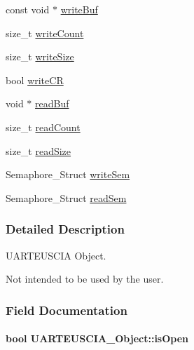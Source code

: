 \begin{DoxyCompactItemize}
const void $\ast$ \hyperlink{struct_u_a_r_t_e_u_s_c_i_a___object_a1bded79263900ea6d78a72709b5aa335}{write\+Buf}
\item 
size\+\_\+t \hyperlink{struct_u_a_r_t_e_u_s_c_i_a___object_afd15a8419bfe376197e0701d1a95848f}{write\+Count}
\item 
size\+\_\+t \hyperlink{struct_u_a_r_t_e_u_s_c_i_a___object_af5b40a1295f842f0c92a2c32d0c51a8c}{write\+Size}
\item 
bool \hyperlink{struct_u_a_r_t_e_u_s_c_i_a___object_aea9d042f8873c67a91522ad6195f3a11}{write\+C\+R}
\item 
void $\ast$ \hyperlink{struct_u_a_r_t_e_u_s_c_i_a___object_a56c5f482d19cd62719e933984c775efe}{read\+Buf}
\item 
size\+\_\+t \hyperlink{struct_u_a_r_t_e_u_s_c_i_a___object_a14152735a1233c10b0323ed9e8db73b5}{read\+Count}
\item 
size\+\_\+t \hyperlink{struct_u_a_r_t_e_u_s_c_i_a___object_a012cc439c2053feea7019ffe985cf8b8}{read\+Size}
\item 
Semaphore\+\_\+\+Struct \hyperlink{struct_u_a_r_t_e_u_s_c_i_a___object_a7d580f915e87c3a315401f488d0ce1d4}{write\+Sem}
\item 
Semaphore\+\_\+\+Struct \hyperlink{struct_u_a_r_t_e_u_s_c_i_a___object_a5bd9e0e33dcb2c8a2004fb920f745fe5}{read\+Sem}
\end{DoxyCompactItemize}


\subsubsection{Detailed Description}
U\+A\+R\+T\+E\+U\+S\+C\+I\+A Object. 

Not intended to be used by the user. 

\subsubsection{Field Documentation}
\paragraph[{is\+Open}]{\setlength{\rightskip}{0pt plus 5cm}bool U\+A\+R\+T\+E\+U\+S\+C\+I\+A\+\_\+\+Object\+::is\+Open}\label{struct_u_a_r_t_e_u_s_c_i_a___object_a876bd31eb61666ec63ac78411407ce84}
